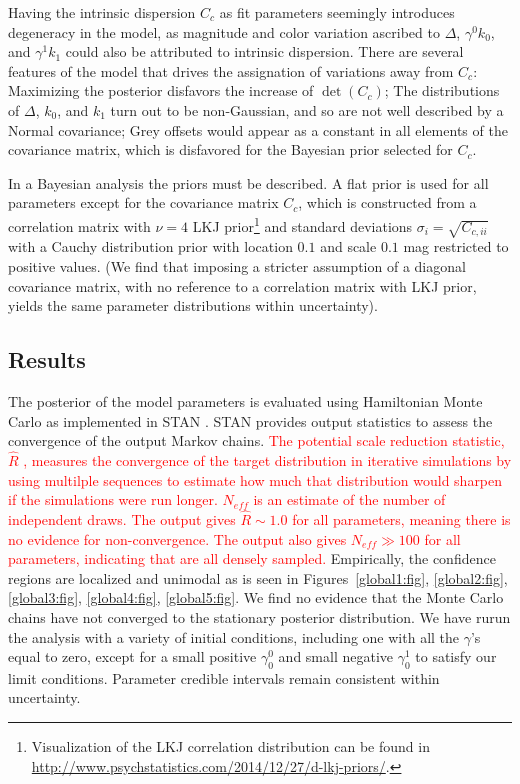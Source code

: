 \documentclass{aastex61}   	%
\begin{document}
\color{black}

Having the intrinsic dispersion $C_c$ as fit parameters seemingly introduces degeneracy in the model, as magnitude and color variation
ascribed to $\Delta$, $\gamma^0 k_0$, and $\gamma^1 k_1$ could also be attributed to intrinsic dispersion.  There are several features of the model
that drives the assignation of variations away from $C_c$:  Maximizing the posterior disfavors the increase of $\det{(C_c)}$;
The distributions of $\Delta$, $k_0$, and $k_1$ turn out to
be non-Gaussian, and so are not well described by a Normal covariance; Grey offsets would appear as a constant
in all elements of the covariance matrix, which is disfavored for the Bayesian prior selected for $C_c$.

In a Bayesian analysis the priors must be described.  A flat prior is used for all parameters except
for the covariance matrix $C_c$, which is constructed from a correlation matrix with  $\nu=4$  LKJ prior\footnote{
Visualization of the LKJ correlation distribution can be found in \url{http://www.psychstatistics.com/2014/12/27/d-lkj-priors/}.}
\citep{Lewandowski20091989} and standard
deviations $\sigma_i = \sqrt{C_{c,ii}}$ with a  Cauchy distribution prior with location
 $0.1$ and scale $0.1$ mag restricted to positive values.  (We find that imposing a stricter assumption of a
 diagonal covariance matrix, with no reference to a correlation matrix with LKJ prior, yields the same parameter distributions within
 uncertainty).

\subsection{Results}
\label{results:sec}
The posterior of the model parameters is evaluated using Hamiltonian Monte Carlo as implemented in
STAN \citep{stan}. STAN provides output statistics to assess
the convergence of the output Markov chains.
\textcolor{red}{The 
potential scale reduction statistic, $\hat{R}$ \citep{Gelman92}, measures the convergence of the target distribution
in iterative simulations 
by using multilple sequences to estimate how much that distribution would sharpen if the simulations were run longer.
$N_{eff}$ is an estimate of the number of independent draws.
The output gives $\hat{R} \sim 1.0$ for all parameters, meaning there is no evidence for non-convergence.  The
output also gives  $N_{eff} \gg 100$ for all parameters, indicating that are all densely sampled.}
Empirically, the confidence regions are localized and unimodal as is seen in  Figures~\ref{global1:fig}, \ref{global2:fig}, \ref{global3:fig}, \ref{global4:fig},
\ref{global5:fig}.  We find no evidence that
the Monte Carlo chains have not converged to the stationary posterior distribution.
We have rurun the analysis with a variety of initial conditions, including one with all the $\gamma$'s equal to zero, except for a small positive 
$\gamma^0_0$ and small negative $\gamma^1_0$ to satisfy our limit conditions.  Parameter credible intervals
remain consistent within uncertainty.
\end{document}
